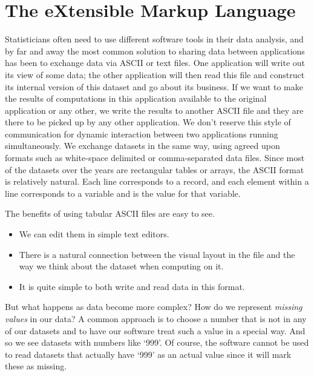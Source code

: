 \chapter{The eXtensible Markup Language}\label{chap:XML}

Statisticians often need to use different software tools in their data
analysis, and by far and away the most common solution to sharing data
between applications has been to exchange data via ASCII or text
files.  One application will write out its view of some data; the
other application will then read this file and construct its internal
version of this dataset and go about its business. If we want to make
the results of computations in this application available to the
original application or any other, we write the results to another
ASCII file and they are there to be picked up by any other
application.  We don't reserve this style of communication for dynamic
interaction between two applications running simultaneously.  We
exchange datasets in the same way, using agreed upon formats such as
white-space delimited or comma-separated data files.  Since most of
the datasets over the years are rectangular tables or arrays, the
ASCII format is relatively natural.  Each line corresponds to a
record, and each element within a line corresponds to a variable and
is the value for that variable.

The benefits of using tabular ASCII files are easy to see. 
\begin{itemize}
\item We can edit them in simple text editors.  
\item There is a natural connection between the visual layout in the 
  file and the way we think about the dataset when computing on it.  
\item It is quite simple to both write and read data in this format.  
\end{itemize}

But what happens as data become more complex? 
How do we represent \textit{missing values} in our data?  A common
approach is to choose a number that is not in any of our datasets and
to have our software treat such a value in a special way. And so we
see datasets with numbers like `999'.  Of course, the software cannot
be used to read datasets that actually have `999' as an actual value
since it will mark these as missing.  

